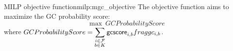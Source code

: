 \begin{definition}{\MGC{} MILP objective function}{milp:mgc_objective}
  The objective function aims to maximize the GC probability score:
  \begin{equation}
    \max ~ GCProbabilityScore
  \end{equation}
  where \(
    \displaystyle GCProbabilityScore = \sum_{\substack{
        i \in \Fragments{} \\
        b \in K
    }} \gcscore{i}{b} \fraggc{i}{b}%
  \).
\end{definition}